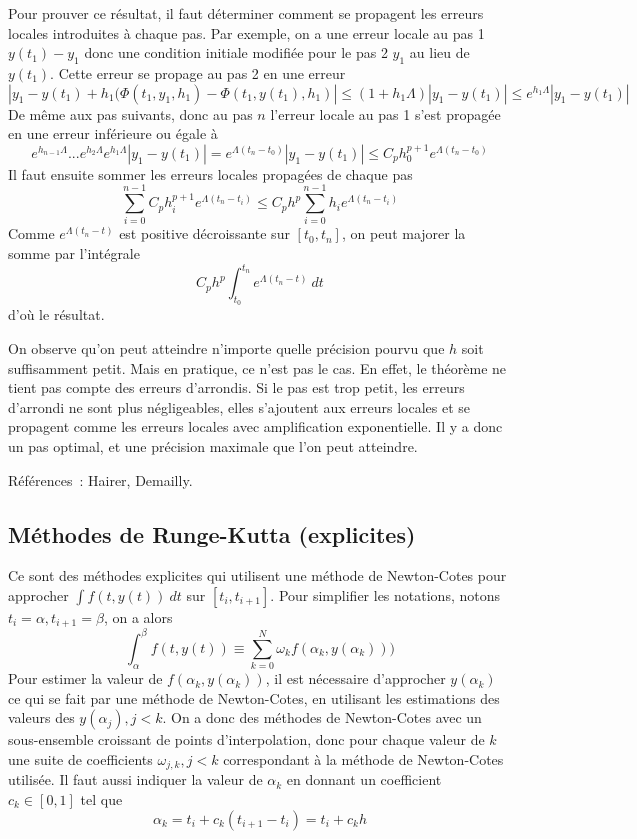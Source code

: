\documentclass[a4paper,11pt]{book}
\begin{document}
\begin{giacjshere}
Pour prouver ce r\'esultat, il faut d\'eterminer comment se propagent
les erreurs locales introduites \`a chaque pas.
Par exemple, on a une erreur locale au pas 1 $y(t_1)-y_1$ donc une
condition initiale modifi\'ee pour le pas 2 $y_1$ au lieu de $y(t_1)$.
Cette erreur se propage au pas 2 en une erreur 
$$| y_1-y(t_1)+h_1(\Phi(t_1,y_1,h_1)-\Phi(t_1,y(t_1),h_1)| 
\leq (1+h_1 \Lambda)|y_1-y(t_1)| \leq e^{h_1 \Lambda} |y_1-y(t_1)|$$
De m\^eme aux pas suivants, donc au pas $n$ l'erreur locale au pas 1
s'est propag\'ee en une erreur inf\'erieure ou \'egale \`a~
$$ e^{h_{n-1} \Lambda}... e^{h_2 \Lambda} e^{h_1 \Lambda} |y_1-y(t_1)|
= e^{\Lambda (t_n-t_0)} |y_1-y(t_1)| \leq C_ph_0^{p+1} e^{\Lambda (t_n-t_0)}$$
Il faut ensuite sommer les erreurs locales propag\'ees de chaque pas
$$ \sum_{i=0}^{n-1} C_p h_i^{p+1} e^{\Lambda (t_n-t_i)} 
\leq C_p h^p \sum_{i=0}^{n-1} h_i e^{\Lambda (t_n-t_i)} $$
Comme $e^{\Lambda(t_n-t)}$ est positive d\'ecroissante sur
$[t_0,t_n]$, on peut majorer la somme par l'int\'egrale
$$ C_p h^p \int_{t_0}^{t_n} e^{\Lambda (t_n-t)} \ dt $$
d'o\`u le r\'esultat.

On observe qu'on peut atteindre n'importe quelle pr\'ecision pourvu
que $h$ soit suffisamment petit. Mais en pratique, ce n'est pas le cas.
En effet, le th\'eor\`eme ne tient pas compte des erreurs d'arrondis.
Si le pas est trop petit, les erreurs d'arrondi ne sont plus n\'egligeables,
elles s'ajoutent aux erreurs locales et se propagent comme les erreurs
locales avec amplification exponentielle.
Il y a donc un pas optimal, et une pr\'ecision maximale que l'on peut
atteindre.

R\'ef\'erences~: Hairer, Demailly.

\subsection{Méthodes de Runge-Kutta (explicites)}
Ce sont des méthodes explicites qui 
utilisent une méthode de Newton-Cotes pour approcher
$\int f(t,y(t)) \ dt$ sur $[t_i,t_{i+1}]$.
Pour simplifier les notations, notons $t_i=\alpha, t_{i+1}=\beta$,
on a alors
$$ \int_{\alpha}^{\beta} f(t,y(t)) 
\equiv \sum_{k=0}^N \omega_k f(\alpha_k,y(\alpha_k)))$$
Pour estimer la valeur de $f(\alpha_k,y(\alpha_k))$, il est nécessaire
d'approcher $y(\alpha_k)$ ce qui se fait par une méthode
de Newton-Cotes, en utilisant les estimations des
valeurs des $y(\alpha_j), j<k$. On a 
donc des méthodes de Newton-Cotes avec un sous-ensemble croissant
de points d'interpolation, donc pour chaque valeur de $k$ une
suite de coefficients $\omega_{j,k}, j<k$ correspondant \`a la
m\'ethode de Newton-Cotes utilis\'ee. Il faut aussi indiquer la valeur de
$\alpha_k$ en donnant un coefficient $c_k \in [0,1]$ tel que
$$ \alpha_k = t_i + c_k (t_{i+1}-t_i) = t_i+c_k h$$


\end{giacjshere}
\end{document}
